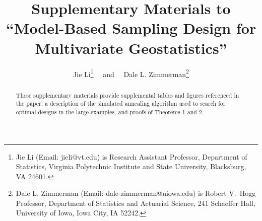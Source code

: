 \documentclass[12pt]{article}
\begin{document}
\title{Supplementary Materials to ``Model-Based Sampling Design for Multivariate Geostatistics''}
\author{Jie Li\thanks{Jie Li (Email: jieli@vt.edu) is Research Assistant Professor, Department of Statistics, Virginia Polytechnic Institute and State University, Blacksburg, VA 24601.} \ \ and \ \ Dale L. Zimmerman\thanks{Dale L. Zimmerman (Email: dale-zimmerman@uiowa.edu) is Robert V.\ Hogg Professor, Department of Statistics and
Actuarial Science, 241 Schaeffer Hall, University of Iowa, Iowa City, IA 52242.}}

\date{}
\maketitle

\begin{abstract}
These supplementary materials provide supplemental tables and figures referenced in the paper, a description of the simulated annealing algorithm used to search for optimal designs in the large examples, and proofs of Theorems 1 and 2.
\end{abstract}

\renewcommand{\baselinestretch}{1.5}

\newpage
\end{document}
